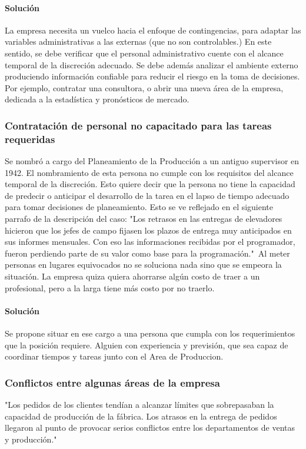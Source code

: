 \documentclass[12pt,a4paper,spanish]{article}
\begin{document}
\paragraph{Soluci\'on}
La empresa necesita un vuelco hacia el enfoque de contingencias, para adaptar las variables administrativas a las externas (que no son controlables.) En este sentido, se debe verificar que el personal administrativo cuente con el alcance temporal de la discreci\'on adecuado. Se debe adem\'{a}s analizar el ambiente externo produciendo informaci\'on confiable para reducir el riesgo en la toma de decisiones. Por ejemplo, contratar una consultora, o abrir una nueva \'area de la empresa, dedicada a la estad\'istica y pron\'osticos de mercado.

\subsubsection{Contrataci\'on de personal no capacitado para las tareas requeridas}
Se nombr\'o a cargo del Planeamiento de la Producci\'on a un antiguo supervisor en 1942. El nombramiento de esta persona no cumple con los requisitos del alcance temporal de la discreci\'on. Esto quiere decir que la persona no tiene la capacidad de predecir o anticipar el desarrollo de la tarea en el lapso de tiempo adecuado para tomar decisiones de planeamiento. Esto se ve reflejado en el siguiente parrafo de la descripci\'on del caso: "Los retrasos en las entregas de elevadores hicieron que los jefes de campo fijasen los plazos de entrega muy anticipados en sus informes mensuales. Con eso las informaciones recibidas por el programador, fueron perdiendo parte de su valor como base para la programaci\'on."\ Al meter personas en lugares equivocados no se soluciona nada sino que se empeora la situaci\'on. La empresa quiza quiera ahorrarse alg\'un costo de traer a un profesional, pero a la larga tiene m\'as costo por no traerlo.
\paragraph{Soluci\'on}
Se propone situar en ese cargo a una persona que cumpla con los requerimientos que la posici\'on requiere. Alguien con experiencia y previsi\'on, que sea capaz de coordinar tiempos y tareas junto con el Area de Produccion.

\subsubsection{Conflictos entre algunas \'areas de la empresa}
"Los pedidos de los clientes tend\'ian a alcanzar l\'imites que sobrepasaban la capacidad de producci\'on de la f\'abrica. Los atrasos en la entrega de pedidos llegaron al punto de provocar serios conflictos entre los departamentos de ventas y producci\'on."
\end{document}
